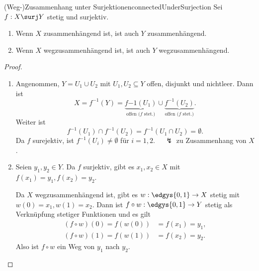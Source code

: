 \documentclass[language=ngerman]{TemplateLecture} %
\begin{document}
\begin{lem}{(Weg-)Zusammenhang unter Surjektionen}{connectedUnderSurjection}
    Sei $f: X \surj Y$ stetig und surjektiv.
    \begin{enumerate}[$(i)$]
        \item Wenn $X$ zusammenhängend ist, ist auch $Y$ zusammenhängend.
        \item Wenn $X$ wegzusammenhängend ist, ist auch $Y$ wegzusammenhängend.
    \end{enumerate}
\end{lem}
\begin{proof}
    \begin{enumerate}[$(i)$:]
        \item Angenommen, $Y = U_1 \cup U_2$ mit $U_1, U_2 \subseteq Y$ offen, disjunkt und nichtleer. Dann ist 
        \begin{equation*}
            X = f^{-1}(Y) = \underset{\text{offen ($f$ stet.)}}{\underbrace{f{-1}(U_1)}} \cup \underset{\text{offen ($f$ stet.)}}{\underbrace{f^{-1}(U_2)}}.
        \end{equation*}
        Weiter ist 
        \begin{equation*}
            f^{-1}(U_1) \cap f^{-1}(U_2) = f^{-1}(U_1 \cap U_2) = \emptyset.
        \end{equation*}
        Da $f$ surejektiv, ist $f^{-1}(U_i) \neq \emptyset$ für $i = 1,2$. $\quad \lightning$ zu Zusammenhang von $X$.
        \item Seien $y_1, y_2 \in Y$. Da $f$ surjektiv, gibt es $x_1, x_2 \in X$ mit $f(x_1) = y_1, f(x_2) = y_2$.

        Da $X$ wegzusammenhängend ist, gibt es $w: \edgys{0,1} \to X$ stetig mit $w(0) = x_1, w(1) = x_2$. Dann ist $f \circ w: \edgys{0,1} \to Y$ stetig als Verknüpfung stetiger Funktionen und es gilt 
        \begin{align*}
            (f \circ w)(0) = f(w(0)) &= f(x_1) = y_1, \\
            (f \circ w)(1) = f(w(1)) &= f(x_2) = y_2.
        \end{align*}
        Also ist $f \circ w$ ein Weg von $y_1$ nach $y_2$.
    \end{enumerate}
\end{proof}
\end{document}

